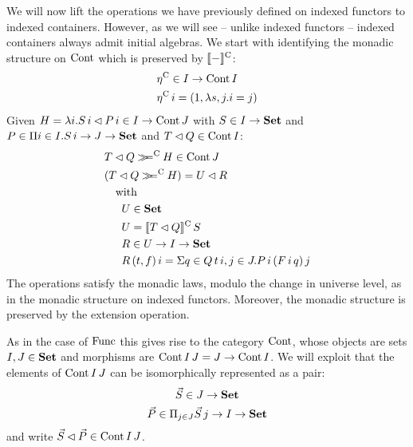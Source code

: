 \documentclass[10pt, conference, compsocconf]{IEEEtran}
\begin{document}
We will now lift the operations we have previously defined on indexed
functors to indexed containers. However, as we will see -- unlike indexed
functors -- indexed containers always admit initial algebras. We start
with identifying the monadic structure on $\mathrm{Cont}$ which is preserved
by $\llbracket-\rrbracket^{\mathrm C}$:
\begin{align*}
  & {\eta}^{\mathrm C} \in I \to \mathrm{Cont}\,I \\
  & {\eta}^{\mathrm C}\,i = (1,\lambda s,j.i=j)
\end{align*}
Given 
$H = \lambda i.S\,i \lhd P\,i\in I\to\mathrm{Cont}\,J$ with $S\in I\to
\mathbf{Set}$ and $P\in\Pi i\in I.S\,i\to J\to\mathbf{Set}$ and $T \lhd Q\in \mathrm{Cont}\,I$:
\begin{align*}
& \cont{T}{Q} \bindC H \in \Cont\,J \\
& (\cont{T}{Q} \bindC H) = \cont{U}{R}\\
&\quad\mathrm{with}\;\;\\
&\quad\;\; U \in \Set \\
&\quad\;\; U = \ExtC{\cont{T}{Q}}\,S \\
&\quad\;\; R \in U \to I \to \Set \\
&\quad\;\; R\,(t,f)\,i = \Sigma q\in Q\,t\,i,j\in J.P\,i\,(F\,i\,q)\,j
\end{align*}
The operations satisfy the monadic laws, modulo the change in universe level,
as in the monadic structure on indexed functors. Moreover,
the monadic structure is preserved by the extension
operation. 

As in the case of $\mathrm{Func}$ this gives rise to the category $\mathrm{Cont}$,
whose objects are sets $I,J\in\mathbf{Set}$ and morphisms are 
$\mathrm{Cont}\,I\,J = J \to \mathrm{Cont}\,I$. We will exploit that the elements of 
$\mathrm{Cont}\,I\,J$ can be isomorphically represented as a pair:
\begin{gather*}
  \vec{S} \in J \to \mathbf{Set}\\
  \vec{P} \in \Pi_{j\in J}\vec{S}\,j \to I \to \mathbf{Set}
\end{gather*}
and write $\vec{S} \lhd \vec{P} \in \mathrm{Cont}\,I\,J$.
\end{document}
